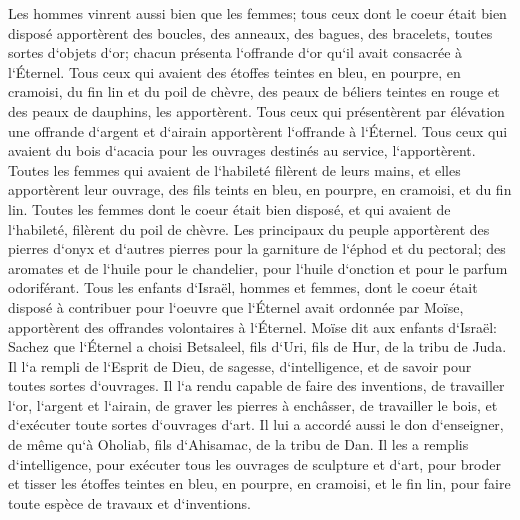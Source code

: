 \verse Les hommes vinrent aussi bien que les femmes; tous ceux dont le coeur était bien disposé apportèrent des boucles, des anneaux, des bagues, des bracelets, toutes sortes d`objets d`or; chacun présenta l`offrande d`or qu`il avait consacrée à l`Éternel. 
\verse Tous ceux qui avaient des étoffes teintes en bleu, en pourpre, en cramoisi, du fin lin et du poil de chèvre, des peaux de béliers teintes en rouge et des peaux de dauphins, les apportèrent. 
\verse Tous ceux qui présentèrent par élévation une offrande d`argent et d`airain apportèrent l`offrande à l`Éternel. Tous ceux qui avaient du bois d`acacia pour les ouvrages destinés au service, l`apportèrent. 
\verse Toutes les femmes qui avaient de l`habileté filèrent de leurs mains, et elles apportèrent leur ouvrage, des fils teints en bleu, en pourpre, en cramoisi, et du fin lin. 
\verse Toutes les femmes dont le coeur était bien disposé, et qui avaient de l`habileté, filèrent du poil de chèvre. 
\verse Les principaux du peuple apportèrent des pierres d`onyx et d`autres pierres pour la garniture de l`éphod et du pectoral; 
\verse des aromates et de l`huile pour le chandelier, pour l`huile d`onction et pour le parfum odoriférant. 
\verse Tous les enfants d`Israël, hommes et femmes, dont le coeur était disposé à contribuer pour l`oeuvre que l`Éternel avait ordonnée par Moïse, apportèrent des offrandes volontaires à l`Éternel. 
\verse Moïse dit aux enfants d`Israël: Sachez que l`Éternel a choisi Betsaleel, fils d`Uri, fils de Hur, de la tribu de Juda. 
\verse Il l`a rempli de l`Esprit de Dieu, de sagesse, d`intelligence, et de savoir pour toutes sortes d`ouvrages. 
\verse Il l`a rendu capable de faire des inventions, de travailler l`or, l`argent et l`airain, 
\verse de graver les pierres à enchâsser, de travailler le bois, et d`exécuter toute sortes d`ouvrages d`art. 
\verse Il lui a accordé aussi le don d`enseigner, de même qu`à Oholiab, fils d`Ahisamac, de la tribu de Dan. 
\verse Il les a remplis d`intelligence, pour exécuter tous les ouvrages de sculpture et d`art, pour broder et tisser les étoffes teintes en bleu, en pourpre, en cramoisi, et le fin lin, pour faire toute espèce de travaux et d`inventions. 

